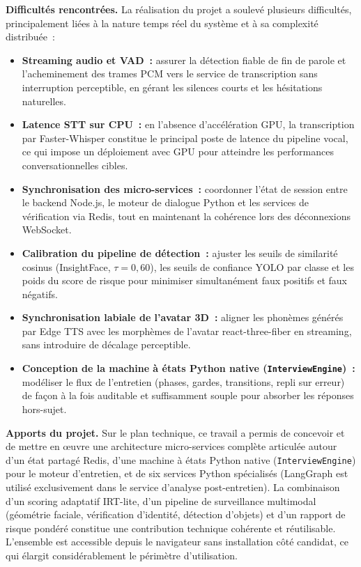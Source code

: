 \noindent\textbf{Difficultés rencontrées.}
La réalisation du projet a soulevé plusieurs difficultés, principalement liées à la
nature temps réel du système et à sa complexité distribuée~:

\begin{itemize}
  \item \textbf{Streaming audio et VAD~:} assurer la détection fiable de fin de parole
        et l'acheminement des trames PCM vers le service de transcription sans interruption
        perceptible, en gérant les silences courts et les hésitations naturelles.
  \item \textbf{Latence STT sur CPU~:} en l'absence d'accélération GPU, la transcription
        par Faster-Whisper constitue le principal poste de latence du pipeline vocal,
        ce qui impose un déploiement avec GPU pour atteindre les performances
        conversationnelles cibles.
  \item \textbf{Synchronisation des micro-services~:} coordonner l'état de session entre
        le backend Node.js, le moteur de dialogue Python et les services de vérification
        via Redis, tout en maintenant la cohérence lors des déconnexions WebSocket.
  \item \textbf{Calibration du pipeline de détection~:} ajuster les seuils de similarité
        cosinus (InsightFace, $\tau = 0{,}60$), les seuils de confiance YOLO par classe
        et les poids du score de risque pour minimiser simultanément faux positifs et
        faux négatifs.
  \item \textbf{Synchronisation labiale de l'avatar 3D~:} aligner les phonèmes générés
        par Edge TTS avec les morphèmes de l'avatar react-three-fiber en streaming,
        sans introduire de décalage perceptible.
  \item \textbf{Conception de la machine à états Python native (\texttt{InterviewEngine})~:} modéliser le flux de
        l'entretien (phases, gardes, transitions, repli sur erreur) de façon à la fois
        auditable et suffisamment souple pour absorber les réponses hors-sujet.
\end{itemize}

\noindent\textbf{Apports du projet.}
Sur le plan technique, ce travail a permis de concevoir et de mettre en œuvre une
architecture micro-services complète articulée autour d'un état partagé Redis, d'une machine à états Python native (\texttt{InterviewEngine}) pour le moteur d'entretien,
et de six services Python spécialisés (LangGraph est utilisé exclusivement dans
le service d'analyse post-entretien). La combinaison d'un scoring
adaptatif IRT-lite, d'un pipeline de surveillance multimodal (géométrie faciale, vérification
d'identité, détection d'objets) et d'un rapport de risque pondéré constitue une contribution
technique cohérente et réutilisable. L'ensemble est accessible depuis le navigateur sans
installation côté candidat, ce qui élargit considérablement le périmètre d'utilisation.

